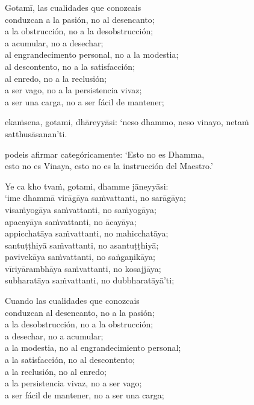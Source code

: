 \begin{english}
  Gotamī, las cualidades que conozcais\\
  conduzcan a la pasión, no al desencanto;\\
  a la obstrucción, no a la desobstrucción;\\
  a acumular, no a desechar;\\
  al engrandecimento personal, no a la modestia;\\
  al descontento, no a la satisfacción;\\
  al enredo, no a la reclusión;\\
  a ser vago, no a la persistencia vivaz;\\
  a ser una carga, no a ser fácil de mantener;
\end{english}

ekaṁsena, gotami, dhāreyyāsi: ‘neso dhammo, neso vinayo, netaṁ satthusāsanan’ti.

\begin{english}
  podeis afirmar categóricamente: ‘Esto no es Dhamma,\\
  esto no es Vinaya, esto no es la instrucción del Maestro.’
\end{english}

Ye ca kho tvaṁ, gotami, dhamme jāneyyāsi:\\
‘ime dhammā virāgāya saṁvattanti, no sarāgāya;\\
visaṁyogāya saṁvattanti, no saṁyogāya;\\
apacayāya saṁvattanti, no ācayāya;\\
appicchatāya saṁvattanti, no mahicchatāya;\\
santuṭṭhiyā saṁvattanti, no asantuṭṭhiyā;\\
pavivekāya saṁvattanti, no saṅgaṇikāya;\\
vīriyārambhāya saṁvattanti, no kosajjāya;\\
subharatāya saṁvattanti, no dubbharatāyā’ti;

\begin{english}
  Cuando las cualidades que conozcais\\
  conduzcan al desencanto, no a la pasión;\\
  a la desobstrucción, no a la obstrucción;\\
  a desechar, no a acumular;\\
  a la modestia, no al engrandecimiento personal;\\
  a la satisfacción, no al descontento;\\
  a la reclusión, no al enredo;\\
  a la persistencia vivaz, no a ser vago;\\
  a ser fácil de mantener, no a ser una carga;
\end{english}

